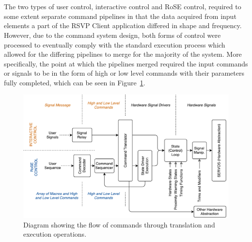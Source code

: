         
        \\\\
          The two types of user control, interactive control and RoSE control, required to some extent separate command pipelines in that the data acquired from input elements a part of the RSVP Client application differed in shape and frequency. However, due to the command system design, both forms of control were processed to eventually comply with the standard execution process which allowed for the differing pipelines to merge for the majority of the system. More specifically, the point at which the pipelines merged required the input commands or signals to be in the form of high or low level commands with their parameters fully completed, which can be seen in Figure~\ref{fig:softDesign-cmdTranslationFlow}.
          
          \begin{figure}[h!]
            \centering
            \includegraphics[width=1\linewidth]{figures/softDesign-cmdTranslationFlow}
            \caption[Diagram showing the flow of commands through translation and execution operations.]{Diagram showing the flow of commands through translation and execution operations.}
            \label{fig:softDesign-cmdTranslationFlow}
          \end{figure}
          
